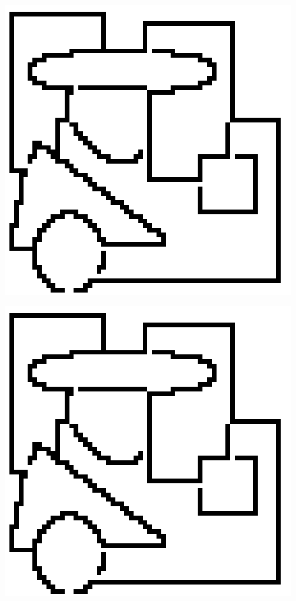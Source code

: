 \begin{multicols}{2}
\lipsum[1]

\begin{minipage}{0.5\linewidth}
	\centering
	\includegraphics[width=0.9\linewidth]{./Experiments/Template/fig/2.png}
\end{minipage}
\begin{minipage}{0.5\linewidth}
	\centering
	\includegraphics[width=0.9\linewidth]{./Experiments/Template/fig/2.png}

\end{minipage}
\end{multicols}
